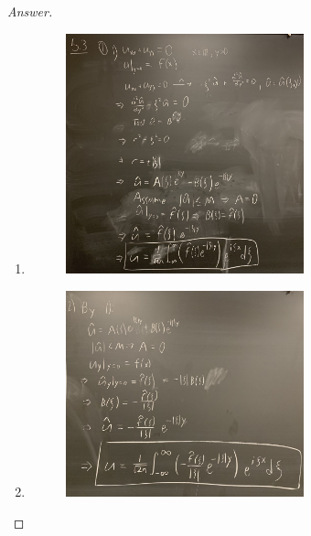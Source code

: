 \documentclass{article}
\theoremstyle{definition}
\renewcommand\qedsymbol{$\blacksquare$}
\newenvironment{ans}{\begin{proof}[Answer]\renewcommand{\qedsymbol}{}}{\end{proof}}
\begin{document}
\begin{ans}
    \begin{enumerate}
        \item \phantom{.}
        \begin{figure}[H]
            \centering
            \includegraphics[width = 0.65\textwidth]{Problem 1 part 1.jpeg}
        \end{figure}

        \item \phantom{.}
        \begin{figure}[H]
            \centering
            \includegraphics[width = 0.65\textwidth]{Problem 1 part 2.jpeg}
        \end{figure}
    \end{enumerate}
\end{ans}
\end{document}
